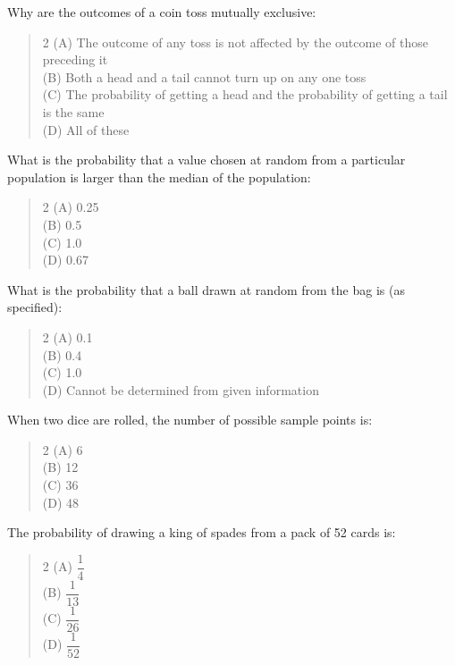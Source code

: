 \documentclass[11pt,a4paper]{article}
\begin{document}
\begin{mcqlist}
\item Why are the outcomes of a coin toss mutually exclusive:
\begin{quote}\begin{multicols}{2}
\noindent (A) The outcome of any toss is not affected by the outcome of those preceding it \\
(B) Both a head and a tail cannot turn up on any one toss \\
(C) The probability of getting a head and the probability of getting a tail is the same \\
(D) All of these
\end{multicols}\end{quote}

\item What is the probability that a value chosen at random from a particular population is larger than the median of the population:
\begin{quote}\begin{multicols}{2}
\noindent (A) 0.25 \\
(B) 0.5 \\
(C) 1.0 \\
(D) 0.67
\end{multicols}\end{quote}

\item What is the probability that a ball drawn at random from the bag is (as specified):
\begin{quote}\begin{multicols}{2}
\noindent (A) 0.1 \\
(B) 0.4 \\
(C) 1.0 \\
(D) Cannot be determined from given information
\end{multicols}\end{quote}

\item When two dice are rolled, the number of possible sample points is:
\begin{quote}\begin{multicols}{2}
\noindent (A) 6 \\
(B) 12 \\
(C) 36 \\
(D) 48
\end{multicols}\end{quote}

\item The probability of drawing a king of spades from a pack of 52 cards is:
\begin{quote}\begin{multicols}{2}
\noindent (A) $\dfrac{1}{4}$ \\
(B) $\dfrac{1}{13}$ \\
(C) $\dfrac{1}{26}$ \\
(D) $\dfrac{1}{52}$
\end{multicols}\end{quote}


\end{mcqlist}
\end{document}
